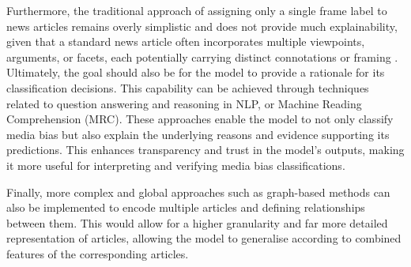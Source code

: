 Furthermore, the traditional approach of assigning only a single frame label to news articles remains overly simplistic and does not provide much explainability, given that a standard news article often incorporates multiple viewpoints, arguments, or facets, each potentially carrying distinct connotations or framing \cite{vallejo-2023-connecting}. Ultimately, the goal should also be for the model to provide a rationale for its classification decisions. This capability can be achieved through techniques related to question answering and reasoning in NLP, or Machine Reading Comprehension (MRC). These approaches enable the model to not only classify media bias but also explain the underlying reasons and evidence supporting its predictions. This enhances transparency and trust in the model's outputs, making it more useful for interpreting and verifying media bias classifications.


Finally, more complex and global approaches such as graph-based methods can also be implemented to encode multiple articles and defining relationships between them. This would allow for a higher granularity and far more detailed representation of articles, allowing the model to generalise according to combined features of the corresponding articles.

